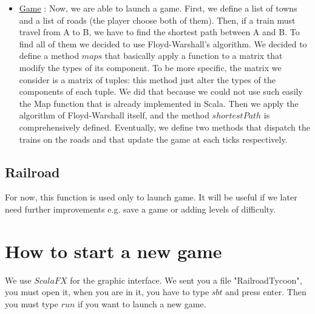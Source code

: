 \documentclass[a4paper]{article}
\begin{document}
\begin{itemize}
		\item \underline{Game} : Now, we are able to launch a game. First, we define a list of towns and a list of roads (the player choose both of them). Then, if a train must travel from A to B, we have to find the shortest path between A and B. To find all of them we decided to use Floyd-Warshall's algorithm. 
		We decided to define a method $maps$ that basically apply a function to a matrix that modify the types of its component. To be more specific, the matrix we consider is a matrix of tuples: this method just alter the types of the components of each tuple. We did that because we could not use such easily the Map function that is already implemented in Scala. 
		Then we apply the algorithm of Floyd-Warshall itself, and the method $shortestPath$ is comprehensively defined.
		Eventually, we define two methods that dispatch the trains on the roads and that update the game at each ticks respectively. 
		
		
		
		
	\end{itemize}
	\subsection{Railroad}
	For now, this function is used only to launch game. It will be useful if we later need further improvements e.g. save a game or adding levels of difficulty.
	\section{How to start a new game}
	
	We use $ScalaFX$ for the graphic interface. We sent you a file "RailroadTycoon", you must open it, when you are in it, you have to type $sbt$ and press enter. Then you must type $run$ if you want to launch a new game.
	
		
\end{document}
